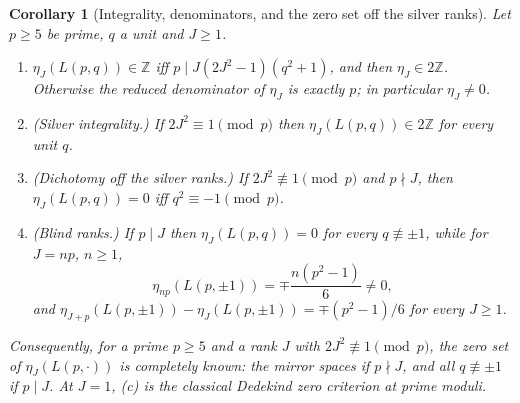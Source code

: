 \documentclass[11pt]{article}
\newtheorem{corollary}[theorem]{Corollary}
\theoremstyle{definition}
\newcommand{\Z}{\mathbb Z}
\begin{document}
\begin{corollary}[Integrality, denominators, and the zero set off the silver ranks]
\label{cor:E}
Let $p\geq5$ be prime, $q$ a unit and $J\geq1$.
\begin{enumerate}[label=(\alph*)]
\item $\eta_J(L(p,q))\in\Z$ iff $p\mid J(2J^2-1)(q^2+1)$, and then
$\eta_J\in2\Z$.  Otherwise the reduced denominator of $\eta_J$ is exactly
$p$; in particular $\eta_J\neq0$.
\item \textup{(Silver integrality.)}  If $2J^2\equiv1\pmod p$ then
$\eta_J(L(p,q))\in2\Z$ for every unit $q$.
\item \textup{(Dichotomy off the silver ranks.)}  If $2J^2\not\equiv1\pmod p$
and $p\nmid J$, then $\eta_J(L(p,q))=0$ iff $q^2\equiv-1\pmod p$.
\item \textup{(Blind ranks.)}  If $p\mid J$ then $\eta_J(L(p,q))=0$ for
every $q\not\equiv\pm1$, while for $J=np$, $n\geq1$,
\begin{equation}
 \eta_{np}(L(p,\pm1))=\mp\frac{n(p^2-1)}6\neq0,
 \label{eq:blind-clifford}
\end{equation}
and $\eta_{J+p}(L(p,\pm1))-\eta_J(L(p,\pm1))=\mp(p^2-1)/6$ for every
$J\geq1$.
\end{enumerate}
Consequently, for a prime $p\geq5$ and a rank $J$ with
$2J^2\not\equiv1\pmod p$, the zero set of $\eta_J(L(p,\cdot))$ is
completely known: the mirror spaces if $p\nmid J$, and all
$q\not\equiv\pm1$ if $p\mid J$.  At $J=1$, (c) is the classical Dedekind
zero criterion at prime moduli.
\end{corollary}
\end{document}
